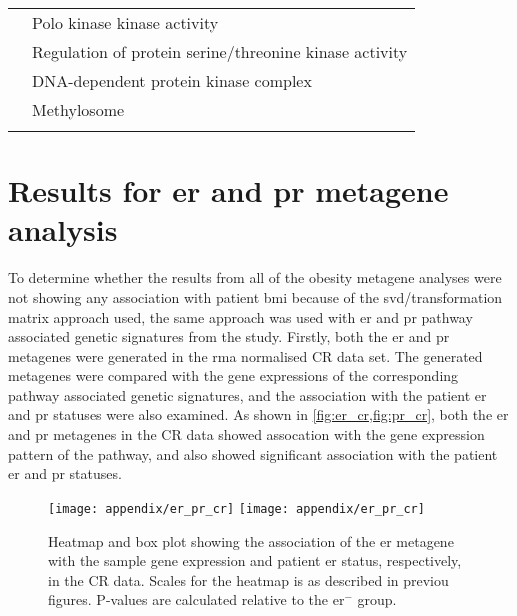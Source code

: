 \begin{appendices}
\begin{longtable}{lp{}}
									 & Polo kinase kinase activity                                                                     \\
									 & Regulation of protein serine/threonine kinase activity                                          \\
									 & DNA-dependent protein kinase complex                                                            \\
									 & Methylosome                                                                                     \\
		\hline
		\hline
		\insertTableNotes
	\end{longtable}

\section{Results for \gls{er} and \gls{pr} metagene analysis}
\label{sec:results_for_er_and_pr_metagene_analysis}

To determine whether the results from all of the obesity metagene analyses were not showing any association with patient \gls{bmi} because of the \gls{svd}/transformation matrix approach used, the same approach was used with \gls{er} and \gls{pr} pathway associated genetic signatures from the \citet{Gatza2010a} study.
Firstly, both the \gls{er} and \gls{pr} metagenes were generated in the \gls{rma} normalised CR data set.
The generated metagenes were compared with the gene expressions of the corresponding pathway associated genetic signatures, and the association with the patient \gls{er} and \gls{pr} statuses were also examined.
As shown in \cref{fig:er_cr,fig:pr_cr}, both the \gls{er} and \gls{pr} metagenes in the CR data showed assocation with the gene expression pattern of the pathway, and also showed significant association with the patient \gls{er} and \gls{pr} statuses.

	\begin{figure}[htp!]
		\centering
		\texttt{[image: appendix/er\_pr\_cr]}
		\hfill
		\texttt{[image: appendix/er\_pr\_cr]}\\
		\caption[\acrshort{er} metagene in the CR data]{Heatmap and box plot showing the association of the \gls{er} metagene with the sample gene expression and patient \gls{er} status, respectively, in the CR data.
		Scales for the heatmap is as described in previou figures.
		P-values  are calculated relative to the \gls{er}$^-$ group.}
		\label{fig:er_cr}
	\end{figure}


\end{appendices}

